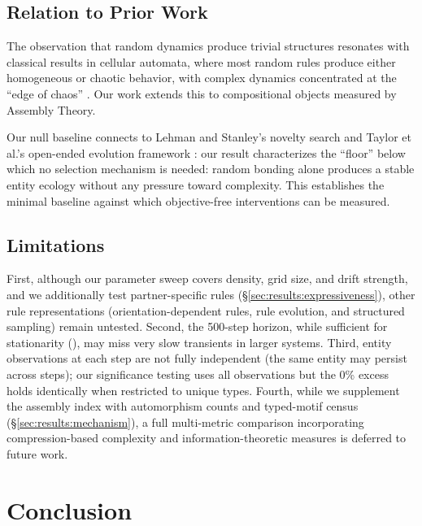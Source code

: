 \documentclass[letterpaper]{article}
\begin{document}
\subsection{Relation to Prior Work}

The observation that random dynamics produce trivial structures resonates
with classical results in cellular automata, where most random rules
produce either homogeneous or chaotic behavior, with complex dynamics
concentrated at the ``edge of chaos''
\citep{langton1990computation, wolfram2002nks}. Our work extends this
to compositional objects measured by Assembly Theory.

Our null baseline connects to Lehman and Stanley's novelty search
\citep{lehman2011novelty} and Taylor et al.'s open-ended evolution
framework \citep{taylor2016openended, taylor2015oee}: our result
characterizes the ``floor'' below which no selection mechanism is
needed: random bonding alone produces a stable entity ecology without
any pressure toward complexity. This establishes the minimal baseline
against which objective-free interventions can be measured.

\subsection{Limitations}

First, although our parameter sweep
covers density, grid size, and drift strength, and we additionally test
partner-specific rules (\S\ref{sec:results:expressiveness}), other rule
representations (orientation-dependent rules, rule evolution, and
structured sampling) remain untested. Second, the 500-step horizon, while sufficient for
stationarity (), may miss very slow transients in
larger systems. Third, entity observations at each step are not fully
independent (the same entity may persist across steps); our significance
testing uses all observations but the 0\% excess holds identically when
restricted to unique types. Fourth, while we supplement the assembly index with automorphism counts
and typed-motif census (\S\ref{sec:results:mechanism}), a full multi-metric comparison
incorporating compression-based complexity and information-theoretic
measures is deferred to future work.


\section{Conclusion}
\end{document}
